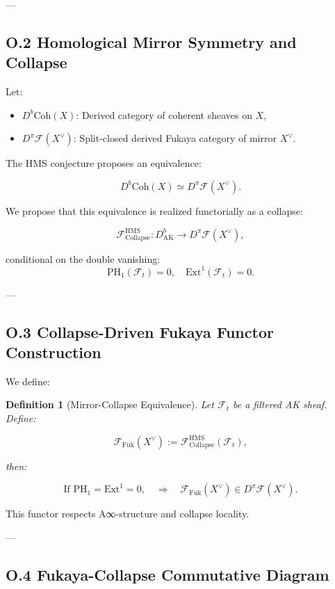 \documentclass[11pt]{article}
\newtheorem{definition}[theorem]{Definition}
\begin{document}
---

\subsection*{O.2 Homological Mirror Symmetry and Collapse}

Let:

\begin{itemize}
  \item $D^b\mathrm{Coh}(X)$: Derived category of coherent sheaves on $X$,
  \item $D^\pi\mathcal{F}(X^\vee)$: Split-closed derived Fukaya category of mirror $X^\vee$.
\end{itemize}

The HMS conjecture proposes an equivalence:

\[
D^b\mathrm{Coh}(X) \simeq D^\pi\mathcal{F}(X^\vee).
\]

We propose that this equivalence is realized functorially as a collapse:

\begin{equation}
\mathcal{F}_{\mathrm{Collapse}}^{\mathrm{HMS}} : D^b_{\mathrm{AK}} \to D^\pi\mathcal{F}(X^\vee),
\end{equation}

conditional on the double vanishing:
\[
\mathrm{PH}_1(\mathcal{F}_t) = 0, \quad \mathrm{Ext}^1(\mathcal{F}_t) = 0.
\]

---

\subsection*{O.3 Collapse-Driven Fukaya Functor Construction}

We define:

\begin{definition}[Mirror-Collapse Equivalence]
Let $\mathcal{F}_t$ be a filtered AK sheaf. Define:

\[
\mathcal{F}_{\mathrm{Fuk}}(X^\vee) := \mathcal{F}_{\mathrm{Collapse}}^{\mathrm{HMS}}(\mathcal{F}_t),
\]

then:

\[
\text{If } \mathrm{PH}_1 = \mathrm{Ext}^1 = 0,\quad \Rightarrow \quad \mathcal{F}_{\mathrm{Fuk}}(X^\vee) \in D^\pi\mathcal{F}(X^\vee).
\]
\end{definition}

This functor respects A∞-structure and collapse locality.

---

\subsection*{O.4 Fukaya-Collapse Commutative Diagram}
\end{document}
